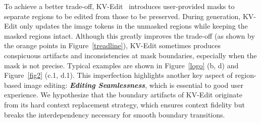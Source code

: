 \documentclass{article}
\begin{document}
To achieve a better trade-off, KV-Edit~\citep{zhu2025kv} introduces user-provided masks to separate regions to be edited from those to be preserved.
During generation, KV-Edit only updates the image tokens in the unmasked regions while keeping the masked regions intact.
Although this greatly improves the trade-off (as shown by the orange points in Figure~\ref{treadline}), KV-Edit sometimes produces conspicuous artifacts and inconsistencies at mask boundaries, especially when the mask is not precise.
Typical examples are shown in Figure~\ref{logo} (b, d) and Figure~\ref{fig2} (c.1, d.1).
This imperfection highlights another key aspect of region-based image editing: \textbf{\textit{Editing Seamlessness}}, which is essential to good user experience.
We hypothesize that the boundary artifacts of KV-Edit originate from its hard context replacement strategy, which ensures context fidelity but breaks the interdependency necessary for smooth boundary transitions.










\end{document}
